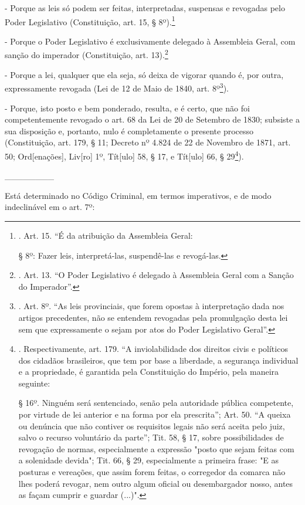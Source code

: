 - Porque as leis só podem ser feitas, interpretadas, suspensas e
revogadas pelo Poder Legislativo (Constituição, art. 15, §
8º).\footnote{. Art. 15. ``É da atribuição da Assembleia Geral:

  § 8º: Fazer leis, interpretá-las, suspendê-las e revogá-las.}

- Porque o Poder Legislativo é exclusivamente delegado à Assembleia
Geral, com sanção do imperador (Constituição, art. 13).\footnote{. Art.
  13. ``O Poder Legislativo é delegado à Assembleia Geral com a Sanção
  do Imperador''.}

- Porque a lei, qualquer que ela seja, só deixa de vigorar quando é, por
outra, expressamente revogada (Lei de 12 de Maio de 1840, art.
8º\footnote{. Art. 8º. ``As leis provinciais, que forem opostas à
  interpretação dada nos artigos precedentes, não se entendem revogadas
  pela promulgação desta lei sem que expressamente o sejam por atos do
  Poder Legislativo Geral''.}).

- Porque, isto posto e bem ponderado, resulta, e é certo, que não foi
competentemente revogado o art. 68 da Lei de 20 de Setembro de 1830;
subsiste a sua disposição e, portanto, nulo é completamente o presente
processo (Constituição, art. 179, § 11; Decreto nº 4.824 de 22 de
Novembro de 1871, art. 50; Ord{[}enações{]}, Liv{[}ro{]} 1º,
Tít{[}ulo{]} 58, § 17, e Tít{[}ulo{]} 66, § 29\footnote{.
  Respectivamente, art. 179. ``A inviolabilidade dos direitos civis e
  políticos dos cidadãos brasileiros, que tem por base a liberdade, a
  segurança individual e a propriedade, é garantida pela Constituição do
  Império, pela maneira seguinte:

  § 16º. Ninguém será sentenciado, senão pela autoridade pública
  competente, por virtude de lei anterior e na forma por ela
  prescrita''; Art. 50. ``A queixa ou denúncia que não contiver os
  requisitos legais não será aceita pelo juiz, salvo o recurso
  voluntário da parte''; Tit. 58, § 17, sobre possibilidades de
  revogação de normas, especialmente a expressão "posto que sejam feitas
  com a solenidade devida"; Tit. 66, § 29, especialmente a primeira
  frase: "E as posturas e vereações, que assim forem feitas, o
  corregedor da comarca não lhes poderá revogar, nem outro algum oficial
  ou desembargador nosso, antes as façam cumprir e guardar (...)".}).

\_\_\_\_\_\_\_\_

Está determinado no Código Criminal, em termos imperativos, e de modo
indeclinável em o art. 7º:

